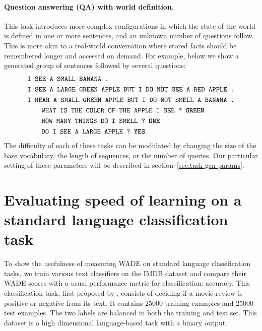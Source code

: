 {\paragraph{Question answering (QA) with world definition.}

This task introduces more complex configurations in which the state of the world is
defined in one or more sentences, and an unknown number of questions follow.
This is more akin to a real-world conversation where stored facts should be
remembered longer and accessed on demand.
For example, below we show a generated group of sentences followed by several questions:
{\fontsize{8}{9.6}\selectfont
  \begingroup
\addtolength{\jot}{-.5em}
\begin{align*}
  &\texttt{I SEE A SMALL BANANA .}\\
  &  \texttt{I SEE A LARGE GREEN APPLE BUT I DO NOT SEE A RED APPLE .} \\
  &  \texttt{I HEAR A SMALL GREEN APPLE BUT I DO NOT SMELL A BANANA .}\\
  &\quad\quad\texttt{WHAT IS THE COLOR OF THE APPLE I SEE ? \textbf{GREEN}}\\
  &\quad\quad\texttt{HOW MANY THINGS DO I SMELL ? \textbf{ONE}}\\
  & \quad\quad\texttt{DO I SEE A LARGE APPLE ? \textbf{YES}}. \\
\end{align*}
\endgroup}
The difficulty of each of these tasks can be modulated by changing the size of the
base vocabulary, the length of sequences, or the number of queries. Our particular setting of these parameters will be described in section~\ref{sec:task-gen-params}.

\section{Evaluating speed of learning on a standard language classification task}

To show the usefulness of measuring \ac{WADE} on standard language classification tasks, we
train various text classifiers on the IMDB dataset and compare their \ac{WADE}
scores with a usual performance metric for classification: accuracy. This
classification task, first proposed by \cite{maassRealTimeComputingStable2002},
consists of deciding if a movie review is positive or negative from its text. It
contains 25000 training examples and 25000 test examples. The two labels are
balanced in both the training and test set. This dataset is a high dimensional
language-based task with a binary output.

}
